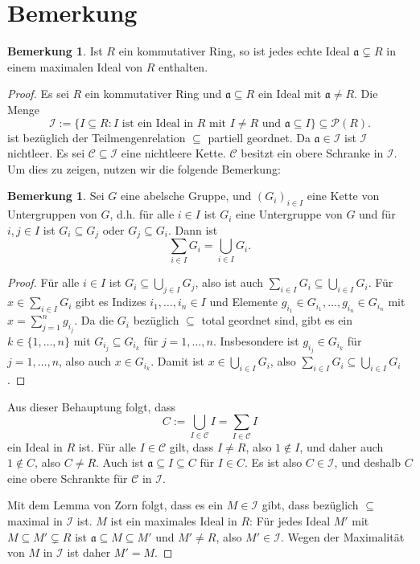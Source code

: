 \documentclass[a4paper,10pt]{article}
\newcounter{satze}
\theoremstyle{definition}
\newtheorem{bem}[satze]{Bemerkung}
\newcommand{\mf}[1]{\mathfrak{#1}}
\newcommand{\mc}[1]{\mathcal{#1}}
\begin{document}
\section*{Bemerkung}

\begin{bem} \label{bem: alle in max}
 Ist $R$ ein kommutativer Ring, so ist jedes echte Ideal $\mf{a} \subsetneq R$ in einem maximalen Ideal von $R$ enthalten.
\end{bem}

\begin{proof}
Es sei $R$ ein kommutativer Ring und $\mf{a} \subseteq R$ ein Ideal mit $\mf{a} \neq R$. Die Menge
\[
 \mc{I} := \{I \subseteq R : I \text{ ist ein Ideal in $R$ mit $I \neq R$ und $\mf{a} \subseteq I$} \} \subseteq \mc{P}(R).
\]
ist bezüglich der Teilmengenrelation $\subseteq$ partiell geordnet. Da $\mf{a} \in \mc{I}$ ist $\mc{I}$ nichtleer. Es sei $\mc{C} \subseteq \mc{I}$ eine nichtleere Kette. $\mc{C}$ besitzt ein obere Schranke in $\mc{I}$. Um dies zu zeigen, nutzen wir die folgende Bemerkung:

\begin{bem}
 Sei $G$ eine abelsche Gruppe, und $(G_i)_{i \in I}$ eine Kette von Untergruppen von $G$, d.h. für alle $i \in I$ ist $G_i$ eine Untergruppe von $G$ und für $i,j \in I$ ist $G_i \subseteq G_j$ oder $G_j \subseteq G_i$. Dann ist
 \[
  \sum_{i \in I} G_i = \bigcup_{i \in I} G_i.
 \]
\end{bem}
\begin{proof}
 Für alle $i \in I$ ist $G_i \subseteq \bigcup_{j \in I} G_j$, also ist auch $\sum_{i \in I} G_i \subseteq \bigcup_{i \in I} G_i$. Für $x \in \sum_{i \in I} G_i$ gibt es Indizes $i_1, \ldots, i_n \in I$ und Elemente $g_{i_1} \in G_{i_1}, \ldots, g_{i_n} \in G_{i_n}$ mit $x = \sum_{j=1}^n g_{i_j}$. Da die $G_i$ bezüglich $\subseteq$ total geordnet sind, gibt es ein $k \in \{1, \ldots, n\}$ mit $G_{i_j} \subseteq G_{i_k}$ für $j=1,\ldots,n$. Insbesondere ist $g_{i_j} \in G_{i_k}$ für $j=1,\ldots,n$, also auch $x \in G_{i_k}$. Damit ist $x \in \bigcup_{i \in I} G_i$, also $\sum_{i \in I} G_i \subseteq \bigcup_{i \in I} G_i$.
\end{proof}

Aus dieser Behauptung folgt, dass
\[
 C := \bigcup_{I \in \mc{C}} I = \sum_{I \in \mc{C}} I
\]
ein Ideal in $R$ ist.
Für alle $I \in \mc{C}$ gilt, dass $I \neq R$, also $1 \not\in I$, und daher auch $1 \not\in C$, also $C \neq R$. Auch ist $\mf{a} \subseteq I \subseteq C$ für $I \in C$. Es ist also $C \in \mc{I}$, und deshalb $C$ eine obere Schrankte für $\mc{C}$ in $\mc{I}$.

Mit dem Lemma von Zorn folgt, dass es ein $M \in \mc{I}$ gibt, dass bezüglich $\subseteq$ maximal in $\mc{I}$ ist. $M$ ist ein maximales Ideal in $R$: Für jedes Ideal $M'$ mit $M \subseteq M' \subsetneq R$ ist $\mf{a} \subseteq M \subseteq M'$ und $M' \neq R$, also $M' \in \mc{I}$. Wegen der Maximalität von $M$ in $\mc{I}$ ist daher $M' = M$.
\end{proof}
\end{document}
